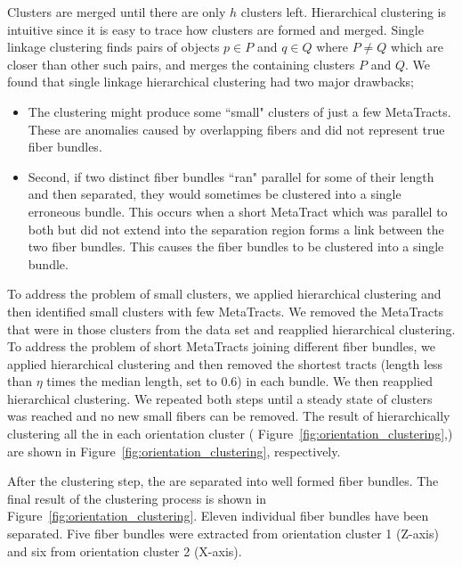 Clusters are merged until there are only $h$ clusters left.
Hierarchical clustering is intuitive since it is easy to trace how clusters are formed and merged.
Single linkage clustering finds pairs of objects $p \in P$ and $q \in Q$ where $P \neq Q$ which are closer than other such pairs, and merges the containing clusters $P$ and $Q$.
We found that single linkage hierarchical clustering had two major drawbacks;
\begin{itemize}[nolistsep]
	\item The clustering might produce some ``small" clusters of just a few MetaTracts.
	These \mt are anomalies caused by overlapping fibers and did not represent true fiber bundles.
	\item Second, if two distinct fiber bundles ``ran" parallel for some of their length and then separated, they would sometimes be clustered into a single erroneous bundle.
	This occurs when a short MetaTract which was parallel to both but did not extend into the separation region forms a link between the two fiber bundles. This causes the fiber bundles to be clustered into a single bundle.
\end{itemize}

To address the problem of small clusters, we applied hierarchical clustering and then identified small clusters with few MetaTracts.
We removed the MetaTracts that were in those clusters from the data set and reapplied hierarchical clustering.
To address the problem of short MetaTracts joining different fiber bundles, we applied hierarchical clustering and then removed the
shortest tracts (length less than $\eta$ times the median length, set to 0.6) in each bundle. We then reapplied hierarchical clustering.
We repeated both steps until a steady state of clusters was reached and no new small fibers can be removed. 
The result of hierarchically clustering all the \mt in each orientation cluster ( Figure~\ref{fig:orientation_clustering},) are shown in Figure~\ref{fig:orientation_clustering}, respectively.
 
 
After the clustering step, the \mt are separated into well formed fiber bundles. The final result of the clustering process is shown in Figure~\ref{fig:orientation_clustering}. Eleven individual fiber bundles have been separated. Five fiber bundles were extracted from orientation cluster 1 (Z-axis) and six from orientation cluster 2 (X-axis).  
